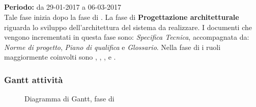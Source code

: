 \subsection{\PA}
\textbf{Periodo:} da 29-01-2017 a 06-03-2017 \\
Tale fase inizia dopo la fase di \AD. La fase di \textbf{Progettazione architetturale} riguarda lo sviluppo dell'architettura del sistema da realizzare. I documenti che vengono incrementati in questa fase sono: \textit{Specifica Tecnica}, accompagnata da: \textit{Norme di progetto}, \textit{Piano di qualifica} e \textit{Glossario}.
Nella fase di \PA{} i ruoli maggiormente coinvolti sono \Progettista, \Responsabile, \Amministratore, \Analista e \Verificatore.
\subsubsection{Gantt attività}
\begin{figure}[H]
	\centering
	\caption{Diagramma di Gantt, fase di \PA}
\end{figure}

